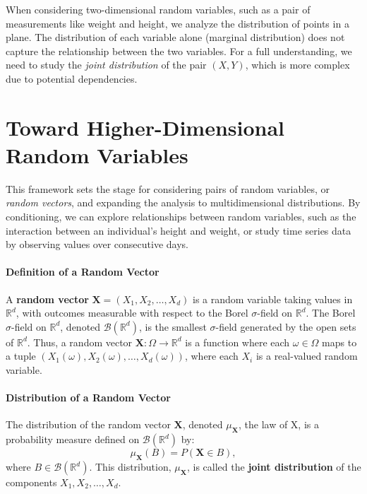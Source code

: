     When considering two-dimensional random variables, such as a pair of measurements like weight and height, we analyze the distribution of points in a plane. The distribution of each variable alone (marginal distribution) does not capture the relationship between the two variables. For a full understanding, we need to study the \emph{joint distribution} of the pair \((X, Y)\), which is more complex due to potential dependencies.
    
    \section{Toward Higher-Dimensional Random Variables}
    This framework sets the stage for considering pairs of random variables, or \emph{random vectors}, and expanding the analysis to multidimensional distributions. By conditioning, we can explore relationships between random variables, such as the interaction between an individual’s height and weight, or study time series data by observing values over consecutive days.
    \paragraph{Definition of a Random Vector}
    A \textbf{random vector} \( \mathbf{X} = (X_1, X_2, \ldots, X_d) \) is a random variable taking values in \( \mathbb{R}^d \), with outcomes measurable with respect to the Borel \(\sigma\)-field on \( \mathbb{R}^d \). \newline 
    The Borel \(\sigma\)-field on \( \mathbb{R}^d \), denoted \( \mathcal{B}(\mathbb{R}^d) \), is the smallest \(\sigma\)-field generated by the open sets of \( \mathbb{R}^d \). Thus, a random vector \( \mathbf{X}: \Omega \to \mathbb{R}^d \) is a function where each \( \omega \in \Omega \) maps to a tuple \( (X_1(\omega), X_2(\omega), \ldots, X_d(\omega)) \), where each \( X_i \) is a real-valued random variable.
    
    \paragraph{Distribution of a Random Vector}
    The distribution of the random vector \( \mathbf{X} \), denoted \( \mu_{\mathbf{X}} \), the law of X, is a probability measure defined on \( \mathcal{B}(\mathbb{R}^d) \) by:
    \[
    \mu_{\mathbf{X}}(B) = P(\mathbf{X} \in B),
    \]
    where \( B \in \mathcal{B}(\mathbb{R}^d) \). \newline
    This distribution, \( \mu_{\mathbf{X}} \), is called the \textbf{joint distribution} of the components \( X_1, X_2, \ldots, X_d \).
    
